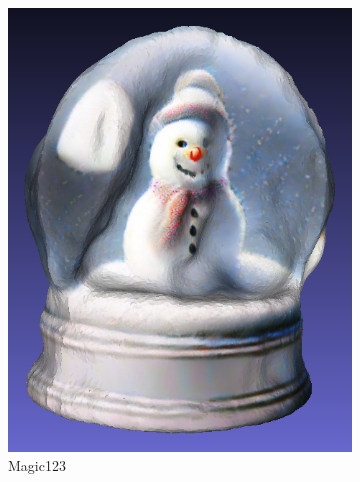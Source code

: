 \begin{figure}[ht]
    \begin{subfigure}[b]{0.234\textwidth}
        \centering
        \includegraphics[width=\textwidth]{etc/a detailed rendering of a snow globe containing a snowman/magic123/magic123_globe_result.png}
        \caption{Magic123}
        \vspace{0.1cm}
    \end{subfigure}
    \begin{subfigure}[b]{0.27\textwidth}
        \centering

\end{subfigure}
\end{figure}
